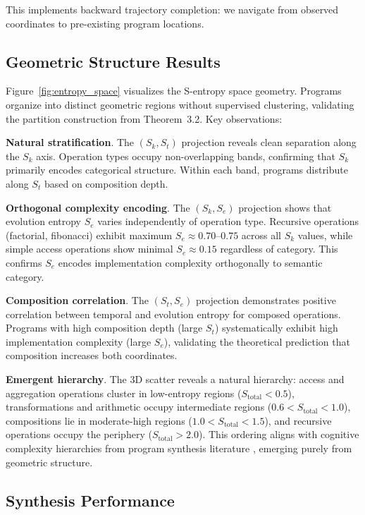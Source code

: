\documentclass[twocolumn,10pt]{article}
\begin{document}
This implements backward trajectory completion: we navigate from observed coordinates to pre-existing program locations.

\subsection{Geometric Structure Results}

Figure~\ref{fig:entropy_space} visualizes the S-entropy space geometry. Programs organize into distinct geometric regions without supervised clustering, validating the partition construction from Theorem~3.2. Key observations:

\textbf{Natural stratification}. The $(S_k, S_t)$ projection reveals clean separation along the $S_k$ axis. Operation types occupy non-overlapping bands, confirming that $S_k$ primarily encodes categorical structure. Within each band, programs distribute along $S_t$ based on composition depth.

\textbf{Orthogonal complexity encoding}. The $(S_k, S_e)$ projection shows that evolution entropy $S_e$ varies independently of operation type. Recursive operations (factorial, fibonacci) exhibit maximum $S_e \approx 0.70$--$0.75$ across all $S_k$ values, while simple access operations show minimal $S_e \approx 0.15$ regardless of category. This confirms $S_e$ encodes implementation complexity orthogonally to semantic category.

\textbf{Composition correlation}. The $(S_t, S_e)$ projection demonstrates positive correlation between temporal and evolution entropy for composed operations. Programs with high composition depth (large $S_t$) systematically exhibit high implementation complexity (large $S_e$), validating the theoretical prediction that composition increases both coordinates.

\textbf{Emergent hierarchy}. The 3D scatter reveals a natural hierarchy: access and aggregation operations cluster in low-entropy regions ($S_{\text{total}} < 0.5$), transformations and arithmetic occupy intermediate regions ($0.6 < S_{\text{total}} < 1.0$), compositions lie in moderate-high regions ($1.0 < S_{\text{total}} < 1.5$), and recursive operations occupy the periphery ($S_{\text{total}} > 2.0$). This ordering aligns with cognitive complexity hierarchies from program synthesis literature \cite{Gulwani2017,Ellis2021}, emerging purely from geometric structure.

\subsection{Synthesis Performance}
\end{document}
